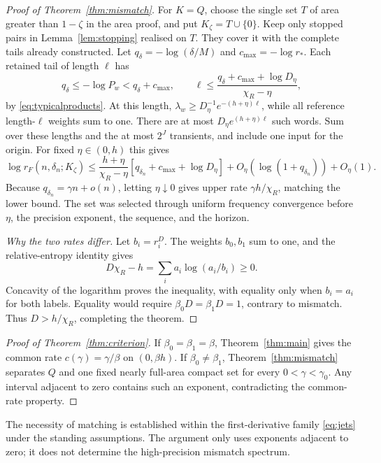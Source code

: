 \documentclass[11pt]{amsart}
\theoremstyle{definition}
\theoremstyle{remark}
\numberwithin{equation}{section}
\begin{document}
\begin{proof}[Proof of Theorem~\ref{thm:mismatch}]
For $K=Q$, choose the single set $T$ of area greater than $1-\zeta$
in the area proof, and put $K_\zeta=T\cup\{0\}$.
Keep only stopped pairs in Lemma~\ref{lem:stopping} realised on $T$.
They cover it with the complete tails already constructed.
Let $q_\delta=-\log(\delta/M)$ and $c_{\max}=-\log r_*$.
Each retained tail of length $\ell$ has
\[
q_\delta\le-\log P_w<q_\delta+c_{\max},\qquad
\ell\le\frac{q_\delta+c_{\max}+\log D_{\eta}}{\chi_R-\eta},
\]
by \eqref{eq:typicalproducts}. At this length,
$\lambda_w\ge D_{\eta}^{-1}e^{-(h+\eta)\ell}$, while all reference
length-$\ell$ weights sum to one. There are at most
$D_{\eta}e^{(h+\eta)\ell}$ such words. Sum over these lengths and the
at most $2^J$ transients, and include one input for the origin.
For fixed $\eta\in(0,h)$ this gives
\begin{equation}\label{eq:typicalstop}
\log r_F(n,\delta_n;K_\zeta)
\le\frac{h+\eta}{\chi_R-\eta}
[q_{\delta_n}+c_{\max}+\log D_{\eta}]
+O_{\eta}(\log(1+q_{\delta_n}))+O_{\eta}(1).
\end{equation}
Because $q_{\delta_n}=\gamma n+o(n)$, letting $\eta\downarrow0$
gives upper rate $\gamma h/\chi_R$, matching the lower bound.
The set was selected through uniform frequency convergence before
$\eta$, the precision exponent, the sequence, and the horizon.

\smallskip
\emph{Why the two rates differ.}
Let $b_i=r_i^D$. The weights $b_0,b_1$ sum to one, and the
relative-entropy identity gives
\[
D\chi_R-h=\sum_i a_i\log(a_i/b_i)\ge0.
\]
Concavity of the logarithm proves the inequality, with equality
only when $b_i=a_i$ for both labels. Equality would require
$\beta_0D=\beta_1D=1$, contrary to mismatch.
Thus $D>h/\chi_R$, completing the theorem.
\end{proof}

\begin{proof}[Proof of Theorem~\ref{thm:criterion}]
If $\beta_0=\beta_1=\beta$, Theorem~\ref{thm:main} gives
the common rate $c(\gamma)=\gamma/\beta$ on $(0,\beta h)$.
If $\beta_0\ne\beta_1$, Theorem~\ref{thm:mismatch} separates
$Q$ and one fixed nearly full-area compact set for every
$0<\gamma<\gamma_0$. Any interval adjacent to zero contains
such an exponent, contradicting the common-rate property.
\end{proof}

The necessity of matching is established within the first-derivative
family \eqref{eq:jets} under the standing assumptions. The argument
only uses exponents adjacent to zero; it does not determine the
high-precision mismatch spectrum.
\end{document}
